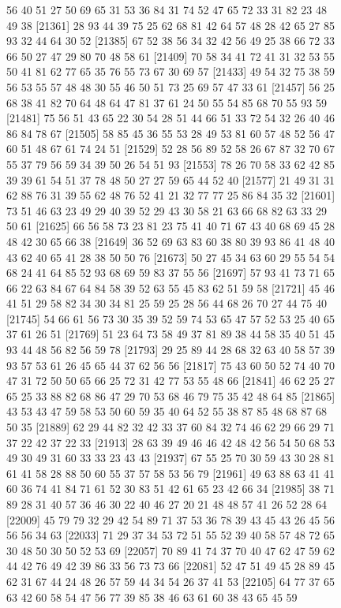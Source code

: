 \documentclass{article}
\begin{document}
\begin{figure}[H]
\begin{Schunk}
\begin{Soutput}
[21337] 56 40 51 27 50 69 65 31 53 36 84 31 74 52 47 65 72 33 31 82 23 48 49 38
[21361] 28 93 44 39 75 25 62 68 81 42 64 57 48 28 42 65 27 85 93 32 44 64 30 52
[21385] 67 52 38 56 34 32 42 56 49 25 38 66 72 33 66 50 27 47 29 80 70 48 58 61
[21409] 70 58 34 41 72 41 31 32 53 55 50 41 81 62 77 65 35 76 55 73 67 30 69 57
[21433] 49 54 32 75 38 59 56 53 55 57 48 48 30 55 46 50 51 73 25 69 57 47 33 61
[21457] 56 25 68 38 41 82 70 64 48 64 47 81 37 61 24 50 55 54 85 68 70 55 93 59
[21481] 75 56 51 43 65 22 30 54 28 51 44 66 51 33 72 54 32 26 40 46 86 84 78 67
[21505] 58 85 45 36 55 53 28 49 53 81 60 57 48 52 56 47 60 51 48 67 61 74 24 51
[21529] 52 28 56 89 52 58 26 67 87 32 70 67 55 37 79 56 59 34 39 50 26 54 51 93
[21553] 78 26 70 58 33 62 42 85 39 39 61 54 51 37 78 48 50 27 27 59 65 44 52 40
[21577] 21 49 31 31 62 88 76 31 39 55 62 48 76 52 41 21 32 77 77 25 86 84 35 32
[21601] 73 51 46 63 23 49 29 40 39 52 29 43 30 58 21 63 66 68 82 63 33 29 50 61
[21625] 66 56 58 73 23 81 23 75 41 40 71 67 43 40 68 69 45 28 48 42 30 65 66 38
[21649] 36 52 69 63 83 60 38 80 39 93 86 41 48 40 43 62 40 65 41 28 38 50 50 76
[21673] 50 27 45 34 63 60 29 55 54 54 68 24 41 64 85 52 93 68 69 59 83 37 55 56
[21697] 57 93 41 73 71 65 66 22 63 84 67 64 84 58 39 52 63 55 45 83 62 51 59 58
[21721] 45 46 41 51 29 58 82 34 30 34 81 25 59 25 28 56 44 68 26 70 27 44 75 40
[21745] 54 66 61 56 73 30 35 39 52 59 74 53 65 47 57 52 53 25 40 65 37 61 26 51
[21769] 51 23 64 73 58 49 37 81 89 38 44 58 35 40 51 45 93 44 48 56 82 56 59 78
[21793] 29 25 89 44 28 68 32 63 40 58 57 39 93 57 53 61 26 45 65 44 37 62 56 56
[21817] 75 43 60 50 52 74 40 70 47 31 72 50 50 65 66 25 72 31 42 77 53 55 48 66
[21841] 46 62 25 27 65 25 33 88 82 68 86 47 29 70 53 68 46 79 75 35 42 48 64 85
[21865] 43 53 43 47 59 58 53 50 60 59 35 40 64 52 55 38 87 85 48 68 87 68 50 35
[21889] 62 29 44 82 32 42 33 37 60 84 32 74 46 62 29 66 29 71 37 22 42 37 22 33
[21913] 28 63 39 49 46 46 42 48 42 56 54 50 68 53 49 30 49 31 60 33 33 23 43 43
[21937] 67 55 25 70 30 59 43 30 28 81 61 41 58 28 88 50 60 55 37 57 58 53 56 79
[21961] 49 63 88 63 41 41 60 36 74 41 84 71 61 52 30 83 51 42 61 65 23 42 66 34
[21985] 38 71 89 28 31 40 57 36 46 30 22 40 46 27 20 21 48 48 57 41 26 52 28 64
[22009] 45 79 79 32 29 42 54 89 71 37 53 36 78 39 43 45 43 26 45 56 56 56 34 63
[22033] 71 29 37 34 53 72 51 55 52 39 40 58 57 48 72 65 30 48 50 30 50 52 53 69
[22057] 70 89 41 74 37 70 40 47 62 47 59 62 44 42 76 49 42 39 86 33 56 73 73 66
[22081] 52 47 51 49 45 28 89 45 62 31 67 44 24 48 26 57 59 44 34 54 26 37 41 53
[22105] 64 77 37 65 63 42 60 58 54 47 56 77 39 85 38 46 63 61 60 38 43 65 45 59

\end{Soutput}
\end{Schunk}
\end{figure}
\end{document}
